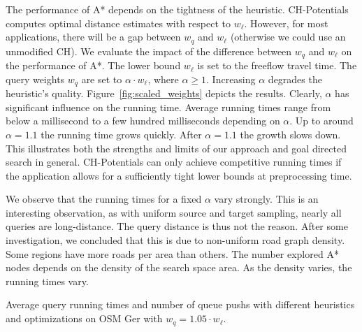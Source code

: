\documentclass[a4paper,USenglish,cleveref, autoref, thm-restate]{lipics-v2019}
\begin{document}
The performance of A* depends on the tightness of the heuristic.
CH-Potentials computes optimal distance estimates with respect to $w_\ell$.
However, for most applications, there will be a gap between $w_q$ and $w_\ell$ (otherwise we could use an unmodified CH).
We evaluate the impact of the difference between $w_q$ and $w_\ell$ on the performance of A*.
The lower bound $w_\ell$ is set to the freeflow travel time.
The query weights $w_q$ are set to $\alpha \cdot w_\ell$, where $\alpha\ge 1$.
Increasing $\alpha$ degrades the heuristic's quality.
Figure~\ref{fig:scaled_weights} depicts the results.
Clearly, $\alpha$ has significant influence on the running time.
Average running times range from below a millisecond to a few hundred milliseconds depending on $\alpha$.
Up to around $\alpha = 1.1$ the running time grows quickly.
After $\alpha = 1.1$ the growth slows down.
This illustrates both the strengths and limits of our approach and goal directed search in general.
CH-Potentials can only achieve competitive running times if the application allows for a sufficiently tight lower bounds at preprocessing time.

We observe that the running times for a fixed $\alpha$ vary strongly.
This is an interesting observation, as with uniform source and target sampling, nearly all queries are long-distance.
The query distance is thus not the reason.
After some investigation, we concluded that this is due to non-uniform road graph density.
Some regions have more roads per area than others.
The number explored A* nodes depends on the density of the search space area.
As the density varies, the running times vary.

\begin{table}
\centering
\caption{Average query running times and number of queue pushs with different heuristics and optimizations on OSM Ger with $w_q = 1.05 \cdot w_\ell$.}\label{tab:building_blocks}

\end{table}
\end{document}
